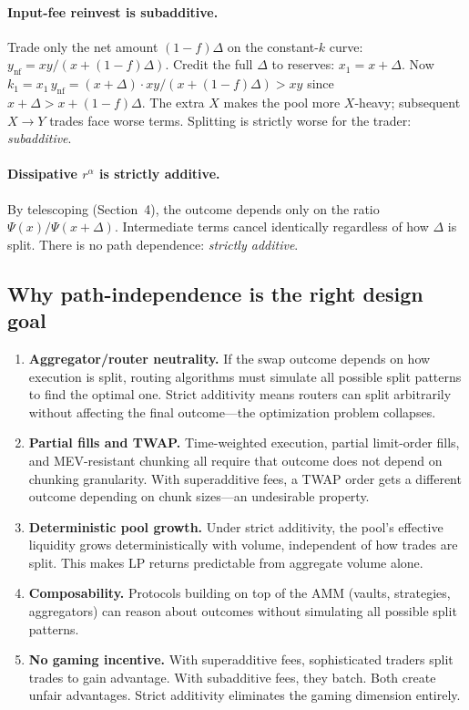 \documentclass[11pt]{article}
\theoremstyle{definition}
\theoremstyle{remark}
\begin{document}
\paragraph{Input-fee reinvest is subadditive.}
Trade only the net amount $(1{-}f)\Delta$ on the constant-$k$ curve: $y_{\mathrm{nf}} = xy/(x{+}(1{-}f)\Delta)$.
Credit the full $\Delta$ to reserves: $x_1 = x+\Delta$.
Now $k_1 = x_1\,y_{\mathrm{nf}} = (x{+}\Delta)\cdot xy/(x{+}(1{-}f)\Delta) > xy$ since $x{+}\Delta > x{+}(1{-}f)\Delta$.
The extra $X$ makes the pool more $X$-heavy; subsequent $X\to Y$ trades face worse terms.
Splitting is strictly worse for the trader: \emph{subadditive}.

\paragraph{Dissipative $r^\alpha$ is strictly additive.}
By telescoping (Section~4), the outcome depends only on the ratio $\Psi(x)/\Psi(x{+}\Delta)$.
Intermediate terms cancel identically regardless of how $\Delta$ is split.
There is no path dependence: \emph{strictly additive}.

\subsection{Why path-independence is the right design goal}

\begin{enumerate}[label=(\alph*)]
\item \textbf{Aggregator/router neutrality.}
If the swap outcome depends on how execution is split, routing algorithms must simulate all possible split patterns to find the optimal one.
Strict additivity means routers can split arbitrarily without affecting the final outcome---the optimization problem collapses.

\item \textbf{Partial fills and TWAP.}
Time-weighted execution, partial limit-order fills, and MEV-resistant chunking all require that outcome does not depend on chunking granularity.
With superadditive fees, a TWAP order gets a different outcome depending on chunk sizes---an undesirable property.

\item \textbf{Deterministic pool growth.}
Under strict additivity, the pool's effective liquidity grows deterministically with volume, independent of how trades are split.
This makes LP returns predictable from aggregate volume alone.

\item \textbf{Composability.}
Protocols building on top of the AMM (vaults, strategies, aggregators) can reason about outcomes without simulating all possible split patterns.

\item \textbf{No gaming incentive.}
With superadditive fees, sophisticated traders split trades to gain advantage. With subadditive fees, they batch.
Both create unfair advantages. Strict additivity eliminates the gaming dimension entirely.
\end{enumerate}
\end{document}
